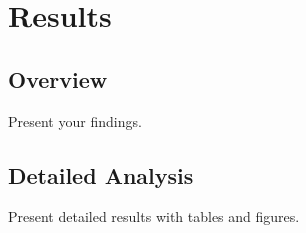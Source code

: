 \chapter{Results}
\label{chap:results}

\section{Overview}

Present your findings.

\section{Detailed Analysis}

Present detailed results with tables and figures.
